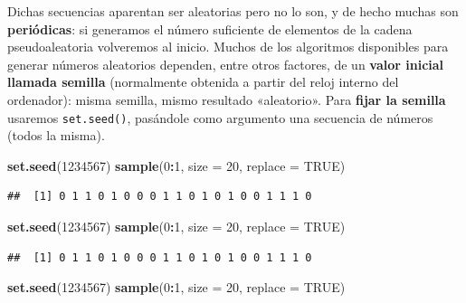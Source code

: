 \documentclass[11pt,]{book}
\newenvironment{Shaded}{\begin{snugshade}}{\end{snugshade}}
\newcommand{\DataTypeTok}[1]{\textcolor[rgb]{0.27,0.27,0.27}{#1}}
\newcommand{\DecValTok}[1]{\textcolor[rgb]{0.06,0.06,0.06}{#1}}
\newcommand{\KeywordTok}[1]{\textcolor[rgb]{0.27,0.27,0.27}{\textbf{#1}}}
\newcommand{\NormalTok}[1]{#1}
\newcommand{\OperatorTok}[1]{\textcolor[rgb]{0.43,0.43,0.43}{\textbf{#1}}}
\newcommand{\OtherTok}[1]{\textcolor[rgb]{0.37,0.37,0.37}{#1}}
\begin{document}
Dichas secuencias aparentan ser aleatorias pero no lo son, y de hecho muchas son \textbf{periódicas}: si generamos el número suficiente de elementos de la cadena pseudoaleatoria volveremos al inicio. Muchos de los algoritmos disponibles para generar números aleatorios dependen, entre otros factores, de un \textbf{valor inicial llamada semilla} (normalmente obtenida a partir del reloj interno del ordenador): misma semilla, mismo resultado «aleatorio». Para \textbf{fijar la semilla} usaremos \texttt{set.seed()}, pasándole como argumento una secuencia de números (todos la misma).

\begin{Shaded}
\begin{Highlighting}[]
\KeywordTok{set.seed}\NormalTok{(}\DecValTok{1234567}\NormalTok{)}
\KeywordTok{sample}\NormalTok{(}\DecValTok{0}\OperatorTok{:}\DecValTok{1}\NormalTok{, }\DataTypeTok{size =} \DecValTok{20}\NormalTok{, }\DataTypeTok{replace =} \OtherTok{TRUE}\NormalTok{)}
\end{Highlighting}
\end{Shaded}

\begin{verbatim}
##  [1] 0 1 1 0 1 0 0 0 1 1 0 1 0 1 0 0 1 1 1 0
\end{verbatim}

\begin{Shaded}
\begin{Highlighting}[]
\KeywordTok{set.seed}\NormalTok{(}\DecValTok{1234567}\NormalTok{)}
\KeywordTok{sample}\NormalTok{(}\DecValTok{0}\OperatorTok{:}\DecValTok{1}\NormalTok{, }\DataTypeTok{size =} \DecValTok{20}\NormalTok{, }\DataTypeTok{replace =} \OtherTok{TRUE}\NormalTok{)}
\end{Highlighting}
\end{Shaded}

\begin{verbatim}
##  [1] 0 1 1 0 1 0 0 0 1 1 0 1 0 1 0 0 1 1 1 0
\end{verbatim}

\begin{Shaded}
\begin{Highlighting}[]
\KeywordTok{set.seed}\NormalTok{(}\DecValTok{1234567}\NormalTok{)}
\KeywordTok{sample}\NormalTok{(}\DecValTok{0}\OperatorTok{:}\DecValTok{1}\NormalTok{, }\DataTypeTok{size =} \DecValTok{20}\NormalTok{, }\DataTypeTok{replace =} \OtherTok{TRUE}\NormalTok{)}
\end{Highlighting}
\end{Shaded}
\end{document}
